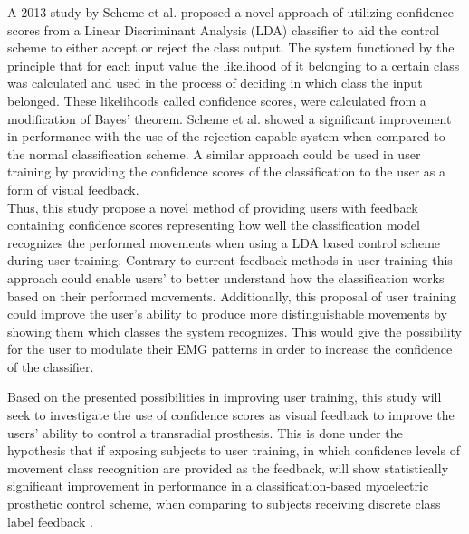 A 2013 study by Scheme et al. \cite{Scheme2013} proposed a novel approach of utilizing confidence scores from a Linear Discriminant Analysis (LDA) classifier to aid the control scheme to either accept or reject the class output. The system functioned by the principle that for each input value the likelihood of it belonging to a certain class was calculated and used in the process of deciding in which class the input belonged. These likelihoods called confidence scores, were calculated from a modification of Bayes' theorem. Scheme et al. \cite{Scheme2013} showed a significant improvement in performance with the use of the rejection-capable system when compared to the normal classification scheme. A similar approach could be used in user training by providing the confidence scores of the classification to the user as a form of visual feedback. \\
Thus, this study propose a novel method of providing users with feedback containing confidence scores representing how well the classification model recognizes the performed movements when using a LDA based control scheme during user training. Contrary to current feedback methods in user training this approach could enable users' to better understand how the classification works based on their performed movements. Additionally, this proposal of user training could improve the user's ability to produce more distinguishable movements by showing them which classes the system recognizes. This would give the possibility for the user to modulate their EMG patterns in order to increase the confidence of the classifier.  

Based on the presented possibilities in improving user training, this study will seek to investigate the use of confidence scores as visual feedback to improve the users' ability to control a transradial prosthesis. %
This is done under the hypothesis that if exposing subjects to user training, in which confidence levels of movement class recognition are provided as the feedback, will show statistically significant improvement in performance in a classification-based myoelectric prosthetic control scheme, when comparing to subjects receiving discrete class label feedback \cite{Fang2017}.





